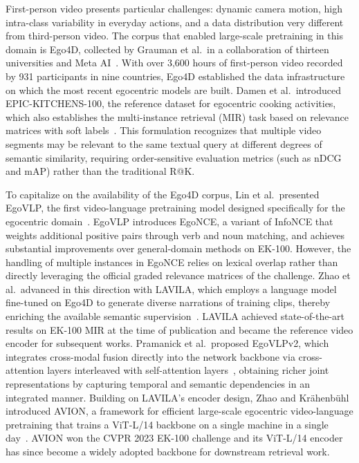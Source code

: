 First-person video presents particular challenges: dynamic camera motion, high intra-class variability in everyday actions, and a data distribution very different from third-person video. The corpus that enabled large-scale pretraining in this domain is Ego4D, collected by Grauman et al.~in a collaboration of thirteen universities and Meta AI~\cite{grauman2022ego4d}. With over 3,600 hours of first-person video recorded by 931 participants in nine countries, Ego4D established the data infrastructure on which the most recent egocentric models are built. Damen et al.~introduced EPIC-KITCHENS-100, the reference dataset for egocentric cooking activities, which also establishes the multi-instance retrieval (MIR) task based on relevance matrices with soft labels~\cite{damen2022rescaling}. This formulation recognizes that multiple video segments may be relevant to the same textual query at different degrees of semantic similarity, requiring order-sensitive evaluation metrics (such as nDCG and mAP) rather than the traditional R@K.

To capitalize on the availability of the Ego4D corpus, Lin et al.~presented EgoVLP, the first video-language pretraining model designed specifically for the egocentric domain~\cite{lin2022egovlp}. EgoVLP introduces EgoNCE, a variant of InfoNCE that weights additional positive pairs through verb and noun matching, and achieves substantial improvements over general-domain methods on EK-100. However, the handling of multiple instances in EgoNCE relies on lexical overlap rather than directly leveraging the official graded relevance matrices of the challenge. Zhao et al.~advanced in this direction with LAVILA, which employs a language model fine-tuned on Ego4D to generate diverse narrations of training clips, thereby enriching the available semantic supervision~\cite{zhao2023lavila}. LAVILA achieved state-of-the-art results on EK-100 MIR at the time of publication and became the reference video encoder for subsequent works. Pramanick et al.~proposed EgoVLPv2, which integrates cross-modal fusion directly into the network backbone via cross-attention layers interleaved with self-attention layers~\cite{pramanick2023egovlpv2}, obtaining richer joint representations by capturing temporal and semantic dependencies in an integrated manner. Building on LAVILA's encoder design, Zhao and Krähenbühl introduced AVION, a framework for efficient large-scale egocentric video-language pretraining that trains a ViT-L/14 backbone on a single machine in a single day~\cite{zhao2023avion}. AVION won the CVPR 2023 EK-100 challenge and its ViT-L/14 encoder has since become a widely adopted backbone for downstream retrieval work.

